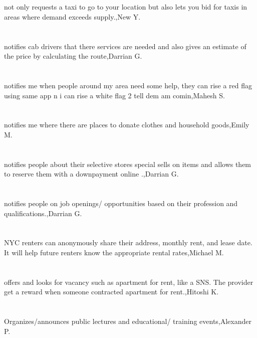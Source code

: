\section{}not only requests a taxi to go to your location but also lets you bid for taxis in areas where demand exceeds supply.,New Y.
\section{}notifies cab drivers that there services are needed and also gives an estimate of the price by calculating the route,Darrian G.
\section{}notifies me when people around my area need some help, they can rise a red flag using same app n i can rise a white flag 2 tell dem am comin,Mahesh S.
\section{}notifies me where there are places to donate clothes and household goods,Emily M.
\section{}notifies people about their selective stores special sells on items and allows them to reserve them with a downpayment online .,Darrian G.
\section{}notifies people on job openings/ opportunities based on their profession and qualifications.,Darrian G.
\section{}NYC renters can anonymously share their address, monthly rent, and lease date. It will help future renters know the appropriate rental rates,Michael M.
\section{}offers and looks for vacancy such as apartment for rent, like a SNS. The provider get a reward when someone contracted apartment for rent.,Hitoshi K.
\section{}Organizes/announces public lectures and educational/ training events,Alexander P.
